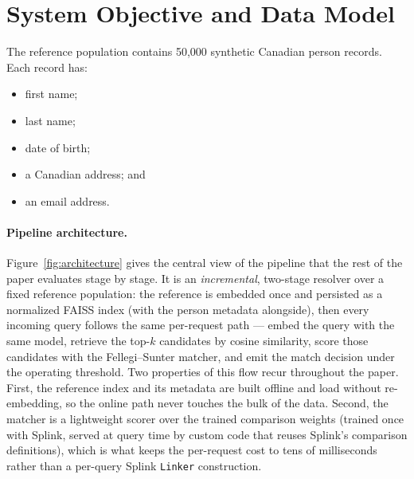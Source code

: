\documentclass[11pt]{article}
\begin{document}
\section{System Objective and Data Model}
The reference population contains 50,000 synthetic Canadian person records. Each record has:
\begin{itemize}[leftmargin=*]
  \item first name;
  \item last name;
  \item date of birth;
  \item a Canadian address; and
  \item an email address.
\end{itemize}

\paragraph{Pipeline architecture.}
Figure~\ref{fig:architecture} gives the central view of the pipeline that the rest of the paper evaluates stage by stage. It is an \emph{incremental}, two-stage resolver over a fixed reference population: the reference is embedded once and persisted as a normalized FAISS index (with the person metadata alongside), then every incoming query follows the same per-request path --- embed the query with the same model, retrieve the top-$k$ candidates by cosine similarity, score those candidates with the Fellegi--Sunter matcher, and emit the match decision under the operating threshold. Two properties of this flow recur throughout the paper. First, the reference index and its metadata are built offline and load without re-embedding, so the online path never touches the bulk of the data. Second, the matcher is a lightweight scorer over the trained comparison weights (trained once with Splink, served at query time by custom code that reuses Splink's comparison definitions), which is what keeps the per-request cost to tens of milliseconds rather than a per-query Splink \texttt{Linker} construction.
\end{document}
